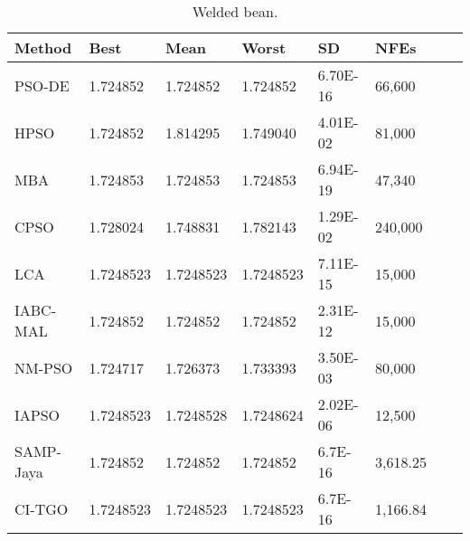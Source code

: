
\begin{table*}[tp]
    \tiny
\begin{center}

\begin{tabular}{ P{2.0cm} P{2.0cm} P{2.0cm} P{2.0cm} P{2.0cm} P{2.0cm} P{2.0cm} P{2.0cm}  }
\hline
\textbf{Method} & \textbf{Best} & \textbf{Mean} & \textbf{Worst} & \textbf{SD} & \textbf{NFEs} \\
\hline
PSO-DE & 1.724852 & 1.724852 & 1.724852 & 6.70E-16 & 66,600 \\
HPSO & 1.724852 & 1.814295 & 1.749040 & 4.01E-02 & 81,000 \\
MBA & 1.724853 & 1.724853 & 1.724853 & 6.94E-19 & 47,340 \\
CPSO & 1.728024 & 1.748831 & 1.782143 & 1.29E-02 & 240,000 \\
LCA & 1.7248523 & 1.7248523 & 1.7248523 & 7.11E-15 & 15,000 \\
IABC-MAL & 1.724852 & 1.724852 & 1.724852 & 2.31E-12 & 15,000 \\
NM-PSO & 1.724717 & 1.726373 & 1.733393 & 3.50E-03 & 80,000 \\
IAPSO & 1.7248523 & 1.7248528 & 1.7248624 & 2.02E-06 & 12,500 \\
SAMP-Jaya & 1.724852 & 1.724852 & 1.724852 & 6.7E-16 & 3,618.25 \\
CI-TGO & 1.7248523 & 1.7248523 & 1.7248523 & 6.7E-16 & 1,166.84 \\


\hline
\end{tabular}
\end{center}

\caption{ Welded bean. \\[1em]}
\label{tab:WB}
\end{table*}

